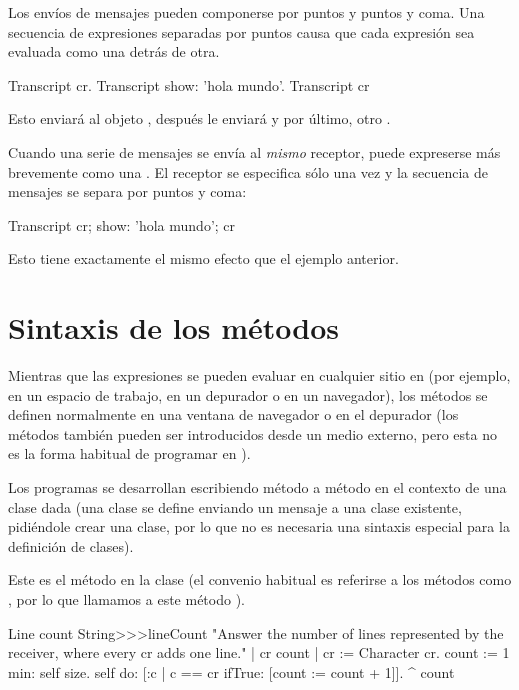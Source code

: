 \documentclass[a4paper,10pt,twoside]{book}
\begin{document}
Los envíos de mensajes pueden componerse por puntos y puntos y coma. Una secuencia de expresiones separadas por puntos causa que cada expresión sea evaluada como una  detrás de otra.

\begin{code}{}
Transcript cr.
Transcript show: 'hola mundo'.
Transcript cr
\end{code}

\noindent
Esto enviará  al objeto , después le enviará  y por último, otro .

Cuando una serie de mensajes se envía al \emph{mismo} receptor, puede expreserse más brevemente como una .
El receptor se especifica sólo una vez y la secuencia de mensajes se separa por puntos y coma:

\begin{code}{}
Transcript cr;
    show: 'hola mundo';
    cr
\end{code}
Esto tiene exactamente el mismo efecto que el ejemplo anterior.

\section{Sintaxis de los métodos}

Mientras que las expresiones se pueden evaluar en cualquier sitio en \pharo (por ejemplo, en un espacio de trabajo, en un depurador o en un navegador), los métodos se definen normalmente en una ventana de navegador o en el depurador
(los métodos también pueden ser introducidos desde un medio externo, pero esta no es la forma habitual de programar en \pharo).

Los programas se desarrollan escribiendo método a método en el contexto de una clase dada (una clase se define enviando un mensaje a una clase existente, pidiéndole crear una clase, por lo que no es necesaria una sintaxis especial para la definición de clases).

Este es el método  en la clase  (el convenio habitual es referirse a los métodos como , por lo que llamamos a este método ).

\begin{method}[lineCount]{Line count}
String>>>lineCount
   "Answer the number of lines represented by the receiver,
   where every cr adds one line."
   | cr count |
   cr := Character cr.
   count := 1 min: self size.
   self do:
      [:c | c == cr ifTrue: [count := count + 1]].
   ^ count
\end{method}
\end{document}
